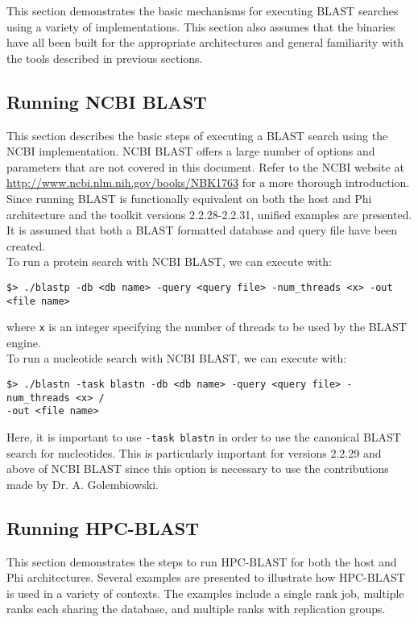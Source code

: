 \documentclass[10pt]{article}
\begin{document}
This section demonstrates the basic mechanisms for executing BLAST searches using a variety of implementations.  This section also assumes that the binaries have all been built for the appropriate architectures and general familiarity with the tools described
in previous sections.

\subsection{Running NCBI BLAST} \label{ssec:runncbi}

This section describes the basic steps of executing a BLAST search using the NCBI implementation.  NCBI BLAST offers a large number of options and parameters that are not covered in this document. Refer to the NCBI website
at \url{http://www.ncbi.nlm.nih.gov/books/NBK1763} for a more thorough introduction.  Since running BLAST is functionally equivalent on both the host and Phi architecture and the toolkit versions 2.2.28-2.2.31, unified examples are presented.
It is assumed that both a BLAST formatted database and query file have been created.\\

\noindent To run a protein search with NCBI BLAST, we can execute with:
\begin{verbatim}
$> ./blastp -db <db name> -query <query file> -num_threads <x> -out <file name>
\end{verbatim}
\noindent where \verb^x^ is an integer specifying the number of threads to be used by the BLAST engine.\\

\noindent To run a nucleotide search with NCBI BLAST, we can execute with:
\begin{verbatim}
$> ./blastn -task blastn -db <db name> -query <query file> -num_threads <x> /
-out <file name>
\end{verbatim}
\noindent Here, it is important to use \verb^-task blastn^ in order to use the canonical BLAST search for nucleotides.  This is particularly important for versions 2.2.29 and above of NCBI BLAST since this option is necessary to use the contributions made
by Dr. A. Golembiowski.

\subsection{Running HPC-BLAST} \label{ssec:runhpc}

This section demonstrates the steps to run HPC-BLAST for both the host and Phi architectures.  Several examples are presented to illustrate how HPC-BLAST is used in a variety of contexts. The examples include a single rank job, multiple ranks
each sharing the database, and multiple ranks with replication groups.
\end{document}
